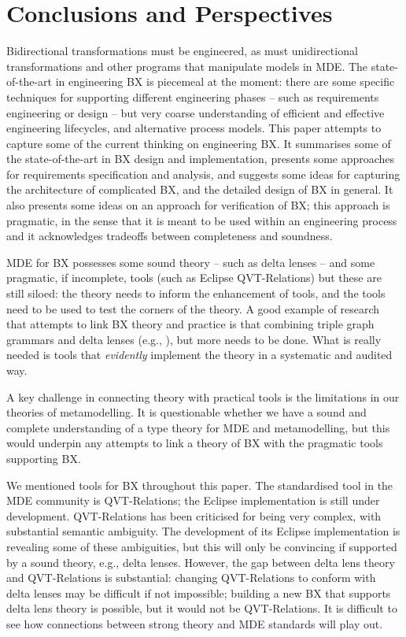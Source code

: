 \section{Conclusions and Perspectives}
\label{section:conclusions}

Bidirectional transformations must be engineered, as must unidirectional transformations and other programs that manipulate models in MDE. The state-of-the-art in engineering BX is piecemeal at the moment: there are some specific techniques for supporting different engineering phases -- such as requirements engineering or design -- but very coarse understanding of efficient and effective engineering lifecycles, and alternative process models. This paper attempts to capture some of the current thinking on engineering BX. It summarises some of the state-of-the-art in BX design and implementation, presents some approaches for requirements specification and analysis, and suggests some ideas for capturing the architecture of complicated BX, and the detailed design of BX in general. It also presents some ideas on an approach for verification of BX; this approach is pragmatic, in the sense that it is meant to be used within an engineering process and it acknowledges tradeoffs between completeness and soundness.

MDE for BX possesses some sound theory -- such as delta lenses -- and some pragmatic, if incomplete, tools (such as Eclipse QVT-Relations) but these are still siloed: the theory needs to inform the enhancement of tools, and the tools need to be used to test the corners of the theory. A good example of research that attempts to link BX theory and practice is that combining triple graph grammars and delta lenses (e.g., \cite{0001EOCDXGE15}), but more needs to be done. What is really needed is tools that \textit{evidently} implement the theory in a systematic and audited way.

A key challenge in connecting theory with practical tools is the limitations in our theories of metamodelling. It is questionable whether we have a sound and complete understanding of a type theory for MDE and metamodelling, but this would underpin any attempts to link a theory of BX with the pragmatic tools supporting BX.

We mentioned tools for BX throughout this paper. The standardised tool in the MDE community is QVT-Relations; the Eclipse implementation is still under development. QVT-Relations has been criticised for being very complex, with substantial semantic ambiguity. The development of its Eclipse implementation is revealing some of these ambiguities, but this will only be convincing if supported by a sound theory, e.g., delta lenses. However, the gap between delta lens theory and QVT-Relations is substantial: changing QVT-Relations to conform with delta lenses may be difficult if not impossible; building a new BX that supports delta lens theory is possible, but it would not be QVT-Relations. It is difficult to see how connections between strong theory and MDE standards will play out. 

